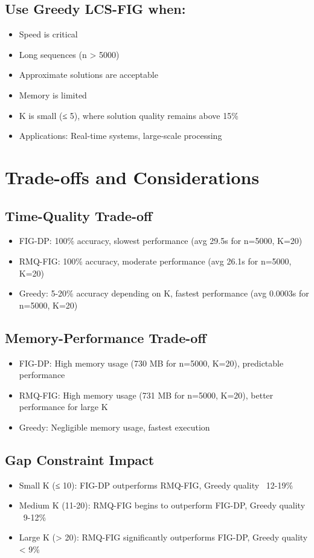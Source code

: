 \documentclass[12pt]{article}
\begin{document}
\subsection{Use Greedy LCS-FIG when:}
\begin{itemize}
    \item Speed is critical
    \item Long sequences (n > 5000)
    \item Approximate solutions are acceptable
    \item Memory is limited
    \item K is small (≤ 5), where solution quality remains above 15\%
    \item Applications: Real-time systems, large-scale processing
\end{itemize}

\section{Trade-offs and Considerations}

\subsection{Time-Quality Trade-off}
\begin{itemize}
    \item FIG-DP: 100\% accuracy, slowest performance (avg 29.5s for n=5000, K=20)
    \item RMQ-FIG: 100\% accuracy, moderate performance (avg 26.1s for n=5000, K=20)
    \item Greedy: 5-20\% accuracy depending on K, fastest performance (avg 0.0003s for n=5000, K=20)
\end{itemize}

\subsection{Memory-Performance Trade-off}
\begin{itemize}
    \item FIG-DP: High memory usage (730 MB for n=5000, K=20), predictable performance
    \item RMQ-FIG: High memory usage (731 MB for n=5000, K=20), better performance for large K
    \item Greedy: Negligible memory usage, fastest execution
\end{itemize}

\subsection{Gap Constraint Impact}
\begin{itemize}
    \item Small K (≤ 10): FIG-DP outperforms RMQ-FIG, Greedy quality ~12-19\%
    \item Medium K (11-20): RMQ-FIG begins to outperform FIG-DP, Greedy quality ~9-12\%
    \item Large K (> 20): RMQ-FIG significantly outperforms FIG-DP, Greedy quality < 9\%
\end{itemize}
\end{document}
